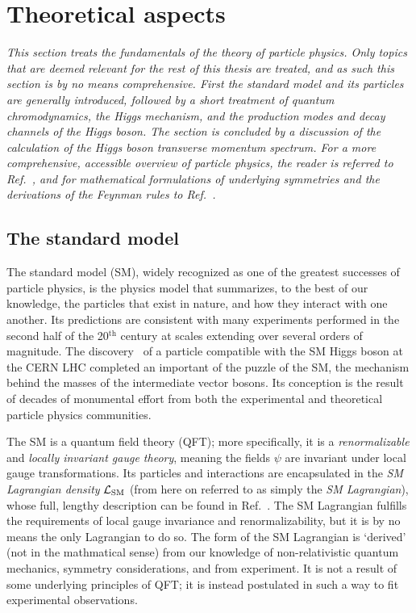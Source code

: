 \section{Theoretical aspects}

\emph{%
% 
This section treats the fundamentals of the theory of particle physics.
% 
Only topics that are deemed relevant for the rest of this thesis are treated, and as such this section is by no means comprehensive.
%
First the standard model and its particles are generally introduced, followed by a short treatment of quantum chromodynamics, the Higgs mechanism, and the production modes and decay channels of the Higgs boson.
% 
The section is concluded by a discussion of the calculation of the Higgs boson transverse momentum spectrum.
% 
For a more comprehensive, accessible overview of particle physics, the reader is referred to Ref.~\cite{griffiths}, and for mathematical formulations of underlying symmetries and the derivations of the Feynman rules to Ref.~\cite{peskin}.
}

\subsection{The standard model}

The standard model (SM), widely recognized as one of the greatest successes of particle physics, is the physics model that summarizes, to the best of our knowledge, the particles that exist in nature, and how they interact with one another.
% 
Its predictions are consistent with many experiments performed in the second half of the 20${}^\text{th}$ century at scales extending over several orders of magnitude.
% 
The discovery~\cite{Aad:2012tfa,Chatrchyan:2012xdj,Chatrchyan:2013lba} of a particle compatible with the SM Higgs boson at the CERN LHC completed an important of the puzzle of the SM, the mechanism behind the masses of the intermediate vector bosons.
% 
Its conception is the result of decades of monumental effort from both the experimental and theoretical particle physics communities.


The SM is a quantum field theory (QFT); more specifically, it is a \textit{renormalizable} and \textit{locally invariant gauge theory}, meaning the fields $\psi$ are invariant under local gauge transformations.
% 
Its particles and interactions are encapsulated in the \textit{SM Lagrangian density} $\mathcal{L}_\text{SM}$ (from here on referred to as simply the \textit{SM Lagrangian}), whose full, lengthy description can be found in Ref.~\cite{fullsmlagrangian}.
% 
The SM Lagrangian fulfills the requirements of local gauge invariance and renormalizability, but it is by no means the only Lagrangian to do so.
% 
The form of the SM Lagrangian is `derived' (not in the mathmatical sense) from our knowledge of non-relativistic quantum mechanics, symmetry considerations, and from experiment.
% 
It is not a result of some underlying principles of QFT; it is instead postulated in such a way to fit experimental observations.



